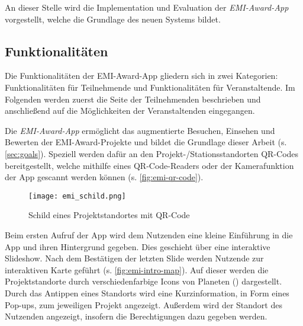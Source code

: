 An dieser Stelle wird die Implementation und Evaluation der
\textit{EMI-Award-App} vorgestellt, welche die Grundlage des neuen Systems bildet.



\subsection{Funktionalitäten} \label{ssec:analysis-old-funk}

Die Funktionalitäten der EMI-Award-App gliedern sich in zwei Kategorien:
Funktionalitäten für Teilnehmende und Funktionalitäten für Veranstaltende.
Im Folgenden werden zuerst die Seite der Teilnehmenden beschrieben und
anschließend auf die Möglichkeiten der Veranstaltenden eingegangen.

Die \textit{EMI-Award-App} ermöglicht das augmentierte Besuchen, Einsehen und
Bewerten der EMI-Award-Projekte und bildet die Grundlage dieser Arbeit (s.
\autoref{sec:goals}). Speziell werden dafür an den Projekt-/Stationsstandorten
QR-Codes bereitgestellt, welche mithilfe eines QR-Code-Readers oder der
Kamerafunktion der App gescannt werden können (s. \autoref{fig:emi-qr-code}).


\begin{figure}[htpb]
    \centering
    \texttt{[image: emi\_schild.png]}
    \caption{Schild eines Projektstandortes mit QR-Code}
    \label{fig:emi-qr-code}
\end{figure}

Beim ersten Aufruf der App wird dem Nutzenden eine kleine Einführung in die App
und ihren Hintergrund gegeben. Dies geschieht über eine interaktive Slideshow.
Nach dem Bestätigen der letzten Slide werden Nutzende zur interaktiven Karte
geführt (s. \autoref{fig:emi-intro-map}). Auf dieser werden die Projektstandorte
durch verschiedenfarbige Icons von Planeten ()
dargestellt. Durch das Antippen eines Standorts wird eine Kurzinformation, in
Form eines Pop-ups, zum jeweiligen Projekt angezeigt. Außerdem wird der
Standort des Nutzenden angezeigt, insofern die Berechtigungen dazu gegeben
werden.

